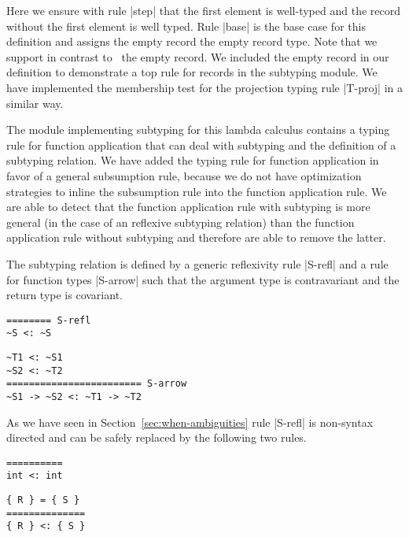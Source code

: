 Here we ensure with rule \code|step| that the first element is
well-typed and the record without the first element is well
typed. Rule \code|base| is the base case for this definition and
assigns the empty record the empty record type. Note that we support
in contrast to~\cite{Pierce:2002:TPL:509043} the empty record. We
included the empty record in our definition to demonstrate a top rule
for records in the subtyping module. We have implemented the membership
test for the projection typing rule \code|T-proj| in a similar way.

The module implementing subtyping for this lambda calculus contains a
typing rule for function application that can deal with subtyping and
the definition of a subtyping relation. We have added the typing rule
for function application in favor of a general subsumption rule,
because we do not have optimization strategies to inline the
subsumption rule into the function application rule. We are able to
detect that the function application rule with subtyping is more
general (in the case of an reflexive subtyping relation) than the
function application rule without subtyping and therefore are able to
remove the latter.

The subtyping relation is defined by a generic reflexivity rule
\code|S-refl| and a rule for function types \code|S-arrow| such that
the argument type is contravariant and the return type is
covariant.

\begin{minipage}{.3\linewidth}
\begin{lstlisting}[language=sltc]
======== S-refl
~S <: ~S
\end{lstlisting}
\end{minipage}
\begin{minipage}{.6\linewidth}
\begin{lstlisting}[language=sltc]
~T1 <: ~S1
~S2 <: ~T2    
======================== S-arrow 
~S1 -> ~S2 <: ~T1 -> ~T2
\end{lstlisting}
\end{minipage}

As we have seen in Section~\ref{sec:when-ambiguities} rule
\code|S-refl| is non-syntax directed and can be safely replaced by the
following two rules.

\begin{minipage}{.3\linewidth}
\begin{lstlisting}[language=sltc]
==========
int <: int
\end{lstlisting}
\end{minipage}
\begin{minipage}{.3\linewidth}
\begin{lstlisting}[language=sltc]
{ R } = { S }
==============
{ R } <: { S }
\end{lstlisting}
\end{minipage}

